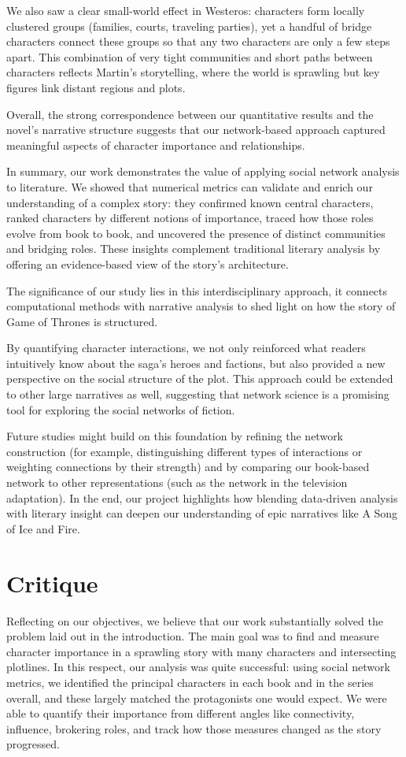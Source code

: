 \documentclass[12pt, a4paper]{article}
\begin{document}
 We also saw a clear small-world effect in Westeros: characters form locally clustered groups 
 (families, courts, traveling parties), yet a handful of bridge characters connect these groups so that any two characters are only a few steps apart. 
 This combination of very tight communities and short paths between characters reflects Martin’s storytelling, 
 where the world is sprawling but key figures link distant regions and plots. 
 
 Overall, the strong correspondence between our quantitative results and the novel’s narrative structure suggests that 
 our network-based approach captured meaningful aspects of character importance and relationships.

In summary, our work demonstrates the value of applying social network analysis to literature. We showed that numerical metrics can validate 
and enrich our understanding of a complex story: 
they confirmed known central characters, ranked characters by different notions of importance, 
traced how those roles evolve from book to book, and uncovered the presence of distinct communities and bridging roles. 
These insights complement traditional literary analysis by offering an evidence-based view of the story’s architecture. 

The significance of our study lies in this interdisciplinary approach, 
it connects computational methods with narrative analysis to shed light on how the story of Game of Thrones is structured. 

By quantifying character interactions, we not only reinforced what readers intuitively know about the saga’s heroes and factions, 
but also provided a new perspective on the social structure of the plot. 
This approach could be extended to other large narratives as well, suggesting that network science is a promising tool for exploring the social networks of fiction.
 

Future studies might build on this foundation by refining the network construction 
 (for example, distinguishing different types of interactions or weighting connections by their strength) 
 and by comparing our book-based network to other representations (such as the network in the television adaptation). 
 In the end, our project highlights how blending data-driven analysis with literary insight can deepen our understanding 
 of epic narratives like A Song of Ice and Fire.

\section{Critique}
Reflecting on our objectives, we believe that our work substantially solved the problem laid out in the introduction. 
The main goal was to find and measure character importance in a sprawling story with many characters and intersecting plotlines. 
In this respect, our analysis was quite successful: using social network metrics, 
we identified the principal characters in each book and in the series overall, 
and these largely matched the protagonists one would expect. We were able to quantify their importance from different angles
like connectivity, influence, brokering roles, and track how those measures changed as the story progressed. 
\end{document}

